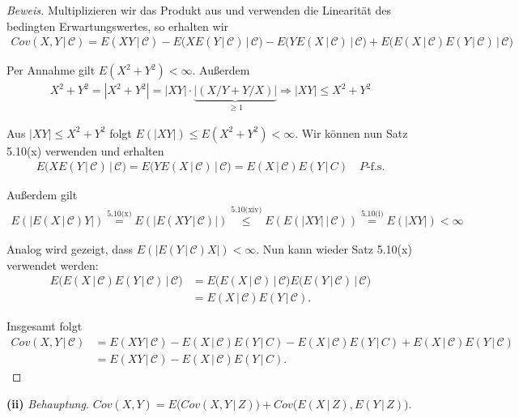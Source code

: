 \documentclass[10pt]{article}
\newcommand{\C}{\mathcal{C}}
\newcommand{\gap}{\,\vert\,}
\newcommand{\beh}{\textit{Behauptung. }}
\begin{document}
\begin{proof}[Beweis]  
	Multiplizieren wir das Produkt aus und verwenden die Linearität des bedingten Erwartungswertes, so erhalten wir
	\begin{align*}
		Cov(X,Y \gap \C) = E(XY \gap \C) - E\big(XE(Y \gap \C) \gap \C \big) - E\big(YE(X \gap \C) \gap \C \big) 
																			 + E\big( E(X \gap \C)E(Y \gap \C) \gap \C \big)
	\end{align*}

	Per Annahme gilt $E(X^2 + Y^2) < \infty$. Außerdem
	\begin{align*}
		X^2+Y^2 = |X^2+Y^2| = |XY|\cdot \underbrace{|(X/Y + Y/X)|}_{\geq 1} \Longrightarrow |XY| \leq X^2+Y^2 
	\end{align*} 

	Aus $|XY| \leq X^2+Y^2$ folgt $E(|XY|) \leq E(X^2 + Y^2) < \infty$. Wir können nun Satz 5.10(x) verwenden und erhalten 
	\begin{align*}
		E\big(XE(Y \gap \C) \gap \C \big) = E\big(YE(X \gap \C) \gap \C \big) = E(X \gap \C) E(Y \gap C) \quad\text{$P$-f.s.}
	\end{align*}

	Außerdem gilt
	\begin{align*}
		E(|E(X \gap \C)Y|) \overset{\text{5.10(x)}}{=} E(|E(XY \gap \C)|) 
		\overset{\text{5.10(xiv)}}{\leq} E(E(|XY| \gap \C)) \overset{\text{5.10(i)}}{=} E(|XY|) < \infty
	\end{align*}

	Analog wird gezeigt, dass $E(|E(Y \gap \C)X|) < \infty$. Nun kann wieder Satz 5.10(x) verwendet werden:
	\begin{align*}
		E\big( E(X \gap \C)E(Y \gap \C) \gap \C \big) &= E\big( E(X \gap \C) \gap \C \big)E\big( E(Y \gap \C) \gap \C \big) \\
													  &= E(X \gap \C) E(Y \gap \C).
	\end{align*}

	Insgesamt folgt 
	\begin{align*}
		Cov(X,Y \gap \C) &= E(XY \gap \C) - E(X \gap \C) E(Y \gap C) - E(X \gap \C) E(Y \gap C) + E(X \gap \C) E(Y \gap \C) \\
						 &= E(XY \gap \C) - E(X \gap \C) E(Y \gap C).
	\end{align*}
\end{proof}

\newpage

\textbf{(ii)}
\beh $Cov(X,Y) = E\big(Cov(X,Y \gap Z)\big) + Cov\big(E(X \gap Z), E(Y \gap Z)\big)$.
\end{document}
